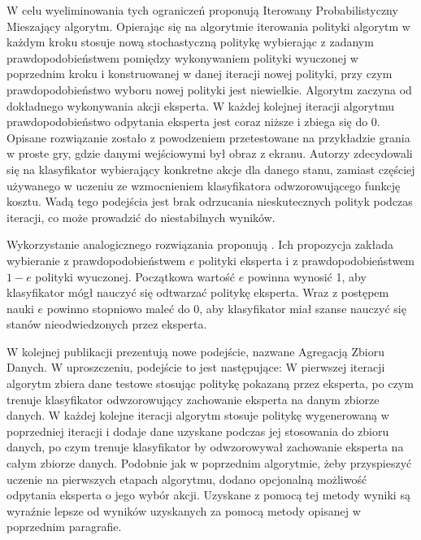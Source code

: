 W celu wyeliminowania tych ograniczeń \cite{DBLP:journals/corr/abs-1011-0686} proponują Iterowany Probabilistyczny Mieszający algorytm. Opierając się na algorytmie iterowania polityki algorytm w każdym kroku stosuje nową stochastyczną politykę wybierając z zadanym prawdopodobieństwem pomiędzy wykonywaniem polityki wyuczonej w poprzednim kroku i konstruowanej w danej iteracji nowej polityki, przy czym prawdopodobieństwo wyboru nowej polityki jest niewielkie. Algorytm zaczyna od dokładnego wykonywania akcji eksperta. W każdej kolejnej iteracji algorytmu prawdopodobieństwo odpytania eksperta jest coraz niższe i zbiega się do 0. Opisane rozwiązanie zostało z powodzeniem przetestowane na przykładzie grania w proste gry, gdzie danymi wejściowymi był obraz z ekranu. Autorzy zdecydowali się na klasyfikator wybierający konkretne akcje dla danego stanu, zamiast częściej używanego w uczeniu ze wzmocnieniem klasyfikatora odwzorowującego funkcję kosztu. Wadą tego podejścia jest brak odrzucania nieskutecznych polityk podczas iteracji, co może prowadzić do niestabilnych wyników.

Wykorzystanie analogicznego rozwiązania proponują \cite{DBLP:journals/corr/BengioVJS15}. Ich propozycja zakłada wybieranie z prawdopodobieństwem $e$ polityki eksperta i z prawdopodobieństwem $1-e$ polityki wyuczonej. Początkowa wartość $e$ powinna wynosić 1, aby klasyfikator mógł nauczyć się  odtwarzać politykę eksperta. Wraz z postępem nauki $e$ powinno stopniowo maleć do 0, aby klasyfikator miał szanse nauczyć się stanów nieodwiedzonych przez eksperta.

W kolejnej publikacji \cite{DBLP:journals/corr/abs-1011-0686} prezentują nowe podejście, nazwane Agregacją Zbioru Danych. W uproszczeniu, podejście to jest następujące: W pierwszej iteracji algorytm zbiera dane testowe stosując politykę pokazaną przez eksperta, po czym trenuje klasyfikator odwzorowujący zachowanie eksperta na danym zbiorze danych. W każdej kolejne iteracji algorytm stosuje politykę wygenerowaną w poprzedniej iteracji i dodaje dane uzyskane podczas jej stosowania do zbioru danych, po czym trenuje klasyfikator by odwzorowywał zachowanie eksperta na całym zbiorze danych. Podobnie jak w poprzednim algorytmie, żeby przyspieszyć uczenie na pierwszych etapach algorytmu, dodano opcjonalną możliwość odpytania eksperta o jego wybór akcji. Uzyskane z pomocą tej metody wyniki są wyraźnie lepsze od wyników uzyskanych za pomocą metody opisanej w poprzednim paragrafie.

